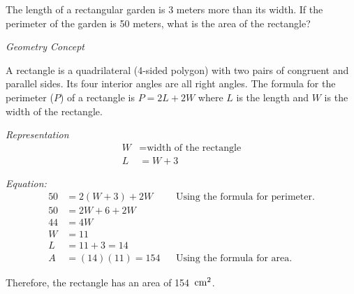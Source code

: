 \begin{example}
\item The length of a rectangular garden is 3 meters more than its width. If the perimeter of the garden is
50 meters, what is the area of the rectangle?

\Solution

\textit{Geometry Concept}

A rectangle is a quadrilateral (4-sided polygon) with two pairs of congruent
and parallel sides. Its four interior angles are all right angles.
The formula for the perimeter ($P$) of a rectangle is $P = 2L + 2W$ where $L$ is
the length and $W$ is the width of the rectangle.


\textit{Representation}
\begin{align*}
W&=\text{width of the rectangle}\\
L&=W+3
\end{align*}

\textit{Equation:}
\begin{align*}
50 &= 2(W + 3) + 2W && \text{Using the formula for perimeter.}\\
50 &= 2W + 6 + 2W \\
44 &= 4W \\
W &= 11 \\
L &= 11 + 3 = 14 \\
A &= (14)(11) = 154 && \text{Using the formula for area.}
\end{align*}

Therefore, the rectangle has an area of 154 $\,\mathrm{cm}^2$.
\end{example}

